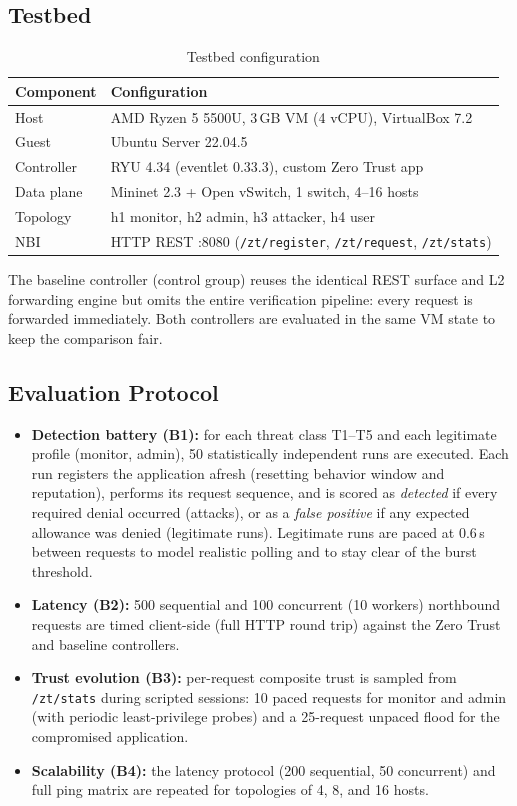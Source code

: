 \documentclass[journal]{IEEEtran}
\begin{document}
\subsection{Testbed}
\begin{table}[t]
\centering
\caption{Testbed configuration}
\label{tab:testbed}
\begin{tabular}{@{}ll@{}}
\toprule
\textbf{Component} & \textbf{Configuration}\\
\midrule
Host & AMD Ryzen 5 5500U, 3\,GB VM (4 vCPU), VirtualBox 7.2\\
Guest & Ubuntu Server 22.04.5\\
Controller & RYU 4.34 (eventlet 0.33.3), custom Zero Trust app\\
Data plane & Mininet 2.3 + Open vSwitch, 1 switch, 4--16 hosts\\
Topology & h1 monitor, h2 admin, h3 attacker, h4 user\\
NBI & HTTP REST :8080 (\texttt{/zt/register}, \texttt{/zt/request}, \texttt{/zt/stats})\\
\bottomrule
\end{tabular}
\end{table}
The baseline controller (control group) reuses the identical REST surface and L2 forwarding engine but omits the entire verification pipeline: every request is forwarded immediately. Both controllers are evaluated in the same VM state to keep the comparison fair.

\subsection{Evaluation Protocol}
\begin{itemize}
\item \textbf{Detection battery (B1):} for each threat class T1--T5 and each legitimate profile (monitor, admin), 50 statistically independent runs are executed. Each run registers the application afresh (resetting behavior window and reputation), performs its request sequence, and is scored as \emph{detected} if every required denial occurred (attacks), or as a \emph{false positive} if any expected allowance was denied (legitimate runs). Legitimate runs are paced at 0.6\,s between requests to model realistic polling and to stay clear of the burst threshold.
\item \textbf{Latency (B2):} 500 sequential and 100 concurrent (10 workers) northbound requests are timed client-side (full HTTP round trip) against the Zero Trust and baseline controllers.
\item \textbf{Trust evolution (B3):} per-request composite trust is sampled from \texttt{/zt/stats} during scripted sessions: 10 paced requests for monitor and admin (with periodic least-privilege probes) and a 25-request unpaced flood for the compromised application.
\item \textbf{Scalability (B4):} the latency protocol (200 sequential, 50 concurrent) and full ping matrix are repeated for topologies of 4, 8, and 16 hosts.
\end{itemize}
\end{document}

